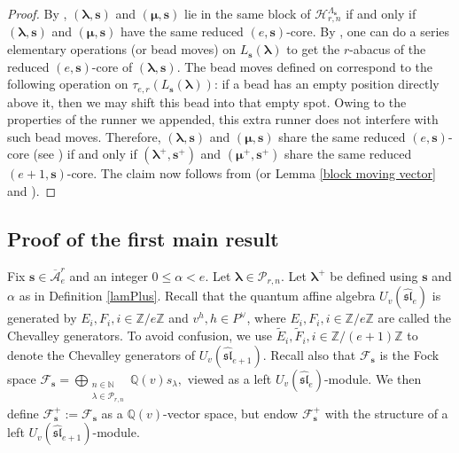 \documentclass[a4paper,10pt]{amsart}
\theoremstyle{plain}
\renewcommand{\H}{\mathcal{H}}
\def\bs{{\boldsymbol{s}}}
\def\Z{{\mathbb Z}}
\def\Lam{\Lambda}
\def\PP{\mathscr{P}}
\def\blam{{\boldsymbol \lambda}}
\def\bmu{{\boldsymbol \mu}}
\theoremstyle{plain}
\numberwithin{equation}{section}
\begin{document}
\begin{proof} By \cite[Corollary 2.27]{JL}, $(\blam,\bs)$ and $(\bmu,\bs)$ lie in the same block of ${\H}_{r,n}^{\Lam_\bs}$ if and only if $(\blam,\bs)$ and $(\bmu,\bs)$ have the same reduced $(e,\bs)$-core. By \cite[1,2, in Page 118, Remark 4.3]{JL}, one can do a series elementary operations (or bead moves) on \(L_{\boldsymbol{s}}(\boldsymbol{\lambda})\) to get the $r$-abacus of the reduced $(e,\bs)$-core of $(\blam,\bs)$. The bead moves defined on  correspond to the following operation on \(\tau_{e, r}(L_{\boldsymbol{s}}(\boldsymbol{\lambda}))\): if a bead has an empty position directly above it, then we may shift this bead into that empty spot. Owing to the properties of the runner we appended, this extra runner does not interfere with such bead moves. Therefore, \((\boldsymbol{\lambda}, \boldsymbol{s})\) and \((\boldsymbol{\mu}, \boldsymbol{s})\) share the same reduced $(e,\bs)$-core (see \cite[Definition 4.1.5]{LQ2025}) if and only if \((\boldsymbol{\lambda}^+, \boldsymbol{s}^+)\) and \((\boldsymbol{\mu}^+, \boldsymbol{s}^+)\) share the same reduced $(e+1,\bs)$-core.
The claim now follows from \cite[Corollary 2.27]{JL} (or Lemma \ref{block moving vector} and \cite[Lemma 4.1.11]{LQ2025}).
\end{proof}


\medskip
\subsection{Proof of the first main result}

Fix $\bs\in \overline{\mathcal A}^r_e$ and an integer $0 \le \alpha < e$. Let $\blam\in\PP_{r,n}$. Let $\blam^+$ be defined using $\bs$ and $\alpha$ as in Definition \ref{lamPlus}. Recall that the quantum affine algebra $U_v(\widehat{\mathfrak{sl}}_e)$ is generated by $E_i,F_i, i\in \Z/e\Z$ and $v^h, h\in P^\vee$, where $E_i,F_i,i\in\Z/e\Z$ are called the Chevalley generators. To avoid confusion, we use $\tilde{E}_i,\tilde{F}_i,i\in\Z/(e+1)\Z$ to denote the Chevalley generators of $U_v(\widehat{\mathfrak{sl}}_{e+1})$. Recall also that \(\mathcal{F}_\bs\) is the Fock space \(\mathcal{F}_\bs=\bigoplus_{\substack{n\in\mathbb{N}\\ \lambda\in\mathcal{P}_{r,n}}}\mathbb{Q}(v)s_\lambda,\) viewed as a left \(U_v(\widehat{\mathfrak{sl}}_e)\)-module. We then define \(\mathcal{F}_\bs^+:=\mathcal{F}_\bs\) as a \(\mathbb{Q}(v)\)-vector space, but endow \(\mathcal{F}_\bs^+\) with the structure of a left \(U_v(\widehat{\mathfrak{sl}}_{e+1})\)-module.
\end{document}
